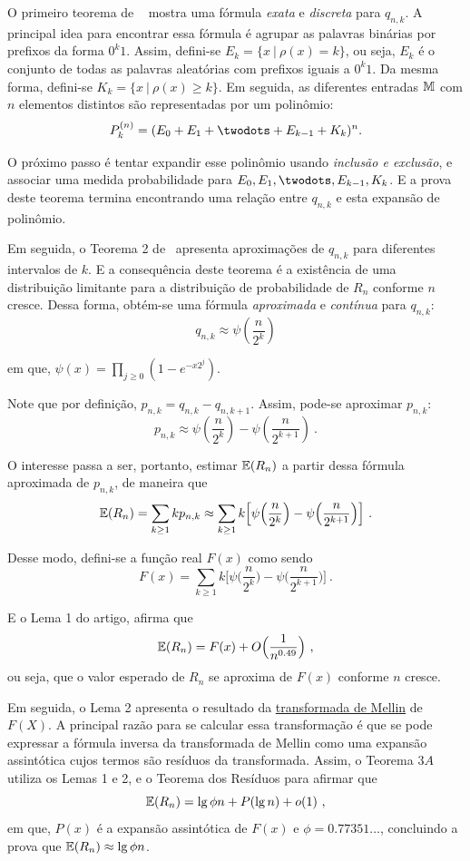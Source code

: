 O primeiro teorema de ~\citep{flajolet:martin:85} mostra uma fórmula \textit{exata} e \textit{discreta} para $q_{n,k}$. 
A principal idea para encontrar essa fórmula é agrupar as palavras binárias por prefixos da forma $0^k1$. Assim, 
defini-se $E_k = \{ x  \ | \ \rho(x) = k \}$, ou seja, $E_k$ é o conjunto de todas as palavras aleatórias com prefixos
iguais a $0^k1$. Da mesma forma, defini-se $K_k = \{ x \ | \ \rho(x) \geq k \}$. Em seguida, as diferentes entradas 
$\mathbb{M}$ com $n$ elementos distintos são representadas por um polinômio:
\[ P_k^{(n)} = (E_0 + E_1 + \twodots + E_{k-1} + K_k)^n .\]

O próximo passo é tentar expandir esse polinômio usando \textit{inclusão e exclusão}, e associar uma medida 
probabilidade para $E_0, E_1, \twodots, E_{k-1}, K_k$. E a prova deste teorema termina encontrando uma relação entre 
$q_{n,k}$ e esta expansão de polinômio.

Em seguida, o Teorema 2 de~\citep{flajolet:martin:85} apresenta aproximações de $q_{n,k}$ para diferentes intervalos de 
$k$. E a consequência deste teorema é a existência de uma distribuição limitante para a distribuição de probabilidade de 
$R_n$ conforme $n$ cresce. Dessa forma, obtém-se uma fórmula \textit{aproximada} e \textit{contínua} para $q_{n,k}$:
\[ q_{n,k} \approx \psi(\frac{n}{2^k}) \]

em que, $\psi(x) = \prod_{j \geq 0} (1 - e^{-x2^j})$.

Note que por definição, $p_{n,k} = q_{n,k} - q_{n,k+1}$. Assim, pode-se aproximar $p_{n,k}$:
\[ p_{n,k} \approx \psi(\frac{n}{2^k}) - \psi(\frac{n}{2^{k+1}}) \ . \]

O interesse passa a ser, portanto, estimar $\mathbb{E}(R_n)$ a partir dessa fórmula aproximada de $p_{n,k}$, de maneira 
que 
\[ \mathbb{E}(R_n) = \sum_{k \geq 1} k p_{n,k} \approx \sum_{k \geq 1} k \Big[ \psi \Big( \frac{n}{2^k} \Big) - \psi 
  \Big( \frac{n}{2^{k+1}} \Big) \Big] \ . \]

Desse modo, defini-se a função real $F(x)$ como sendo
\[ F(x) =  \sum_{k \geq 1} k \Big[ \psi \Big( \frac{n}{2^k} \Big) - \psi \Big( \frac{n}{2^{k+1}} \Big) \Big] \ . \]

E o Lema 1 do artigo, afirma que 
\[ \mathbb{E}(R_n) = F(x) + O \Big( \frac{1}{n^{0.49}} \Big) \ , \]
ou seja, que o valor esperado de $R_n$ se aproxima de $F(x)$ conforme $n$ cresce.

Em seguida, o Lema 2 apresenta o resultado da \hyperref[ap:mellin]{transformada de Mellin} de $F(X)$. A principal razão 
para se calcular essa transformação é que se pode expressar a fórmula inversa da transformada de Mellin como uma 
expansão assintótica cujos termos são resíduos da transformada. Assim, o Teorema $3A$ utiliza os Lemas 1 e 2, e o 
Teorema dos Resíduos para afirmar que 
\[ \Ebb(R_n) = \lg \phi n + P(\lg n) + o(1) \ , \]
em que, $P(x)$ é a expansão assintótica de $F(x)$ e $\phi = 0.77351{\dots}$, concluindo a prova que 
$\mathbb{E}(R_n) \approx \lg \phi n$.


